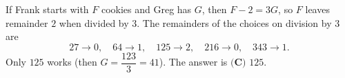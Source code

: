 If Frank starts with $F$ cookies and Greg has $G$, then $F-2=3G$, so $F$ leaves remainder $2$ when divided by $3$. The remainders of the choices on division by $3$ are
\[27\to0,\quad64\to1,\quad125\to2,\quad216\to0,\quad343\to1.\]
Only $125$ works (then $G=\dfrac{123}{3}=41$). The answer is $\boxed{\textbf{(C) }125}$.
